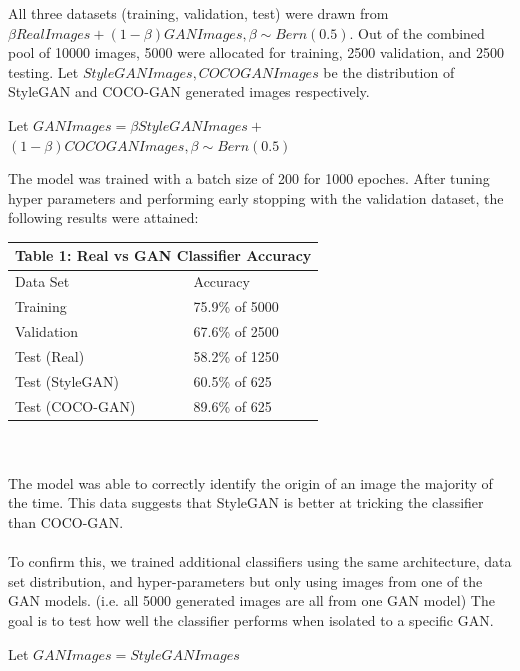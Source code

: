 \documentclass[10pt]{article}
\begin{document}
\begin{multicols*}{2}
        All three datasets (training, validation, test) were drawn from $\beta RealImages + (1 - \beta)GANImages, \beta \sim Bern(0.5)$.
        Out of the combined pool of 10000 images, 5000 were allocated for training, 2500 validation, and 2500 testing.
        Let $StyleGANImages, COCOGANImages$ be the distribution of StyleGAN and COCO-GAN generated images respectively.
        \begin{center}
            Let $GANImages = \beta StyleGANImages +$\\$(1 - \beta) COCOGANImages, \beta \sim Bern(0.5)$
        \end{center}
        The model was trained with a batch size of 200 for 1000 epoches.
        After tuning hyper parameters and performing early stopping with the validation dataset, the following results were attained:\\

        \begin{tabular}{ |p{4cm}|p{3cm}|  }
         \hline
         \multicolumn{2}{|c|}{Table 1: \textbf{Real vs GAN Classifier Accuracy}} \\
         \hline
        Data Set     & Accuracy\\
         \hline
        Training        & 75.9\% of 5000 \\
         \hline
        Validation      & 67.6\% of 2500 \\
         \hline
        Test (Real)     & 58.2\% of 1250 \\
         \hline
        Test (StyleGAN) & 60.5\% of 625  \\
         \hline
        Test (COCO-GAN) & 89.6\% of 625 \\
         \hline
        \end{tabular}
        \\\\
        The model was able to correctly identify the origin of an image the majority of the time.
        This data suggests that StyleGAN is better at tricking the classifier than COCO-GAN.
        \\\\
        To confirm this, we trained additional classifiers using the same architecture, data set distribution, and hyper-parameters but only using images from one of the GAN models.
        (i.e. all 5000 generated images are all from one GAN model)
        The goal is to test how well the classifier performs when isolated to a specific GAN.
        
        Let $GANImages = StyleGANImages$\\


\end{multicols*}
\end{document}
